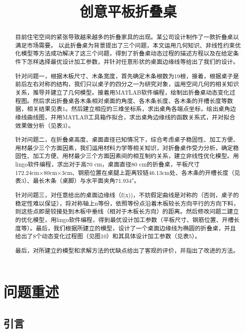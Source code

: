 \documentclass[withoutpreface,bwprint]{cumcmthesis}
\title{创意平板折叠桌}
\begin{document}
 \maketitle
 \begin{abstract}
 目前住宅空间的紧张导致越来越多的折叠家具的出现。某公司设计制作了一款折叠桌以满足市场需要。
 以此折叠桌为背景提出了三个问题，本文运用几何知识、非线性约束优化模型等方法成功解决了这三个问题，得到了折叠桌动态过程的描述方程以及在给定条件下怎样选择最优设计加工参数，并针对任意形状的桌面边缘线等给出了我们的设计。


针对问题一，根据木板尺寸、木条宽度，首先确定木条根数为19根，接着，根据桌子是前后左右对称的结构，我们只以桌子的四分之一为研究对象，运用空间几何的相关知识关系，推导并建立了几何模型。接着用MATLAB软件编程，绘制出折叠桌动态变化过程图。然后求出折叠桌各木条相对桌面的角度、各木条长度、各木条的开槽长度等数据，相关结果见表1。然后建立相应的三维坐标系，求出桌角各端点坐标，绘出桌角边缘线曲线图，并用MATLAB工具箱作拟合，求出桌角边缘线的函数关系式，并对拟合效果做分析（见表3）。


针对问题二，在折叠桌高度、桌面直径已知情况下，综合考虑桌子稳固性、加工方便、用材最少三个方面因素，我们运用材料力学等相关知识，对折叠桌作受力分析，确定稳固性、加工方便、用材最少三个方面因素间的相互制约关系，建立非线性优化模型。用lingo软件编程，求出对于高70 cm，桌面直径80 cm的折叠桌，平板尺寸172.24cm×80cm×3cm、钢筋位置在桌腿上距离铰链46.13cm处、各木条的开槽长度（见表3）、最长木条（桌脚）与水平面夹角71.934°。

针对问题三，对任意给出的桌面边缘线（f(x))，不妨假定曲线是对称的（否则，桌子的稳定性难以保证），将对称轴上n等份，依照等份点沿着木板较长方向平行的方向下料，则这些点即是铰接处到木板中垂线（相对于木板长方向）的距离。然后修改问题二建立的优化模型，用lingo软件编程，得到最优设计加工参数（平板尺寸、钢筋位置、开槽长度等）。最后，我们根据所建立的模型，设计了一个桌面边缘线为椭圆的折叠桌，并且给出了8个动态变化过程图（见图10）和其具体设计加工参数（见表5）。

最后，对所建立的模型和求解方法的优缺点给出了客观的评价，并指出了改进的方法。

\end{abstract}

\section{问题重述}

\subsection{引言}
\end{document}
